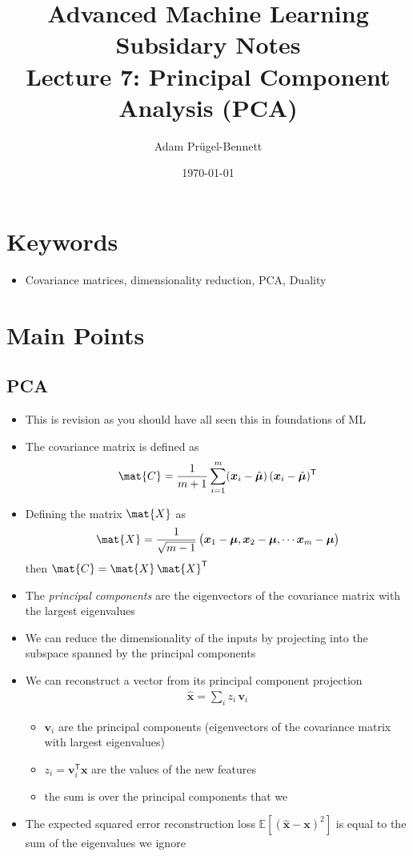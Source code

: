\documentclass[11pt]{article}
\author{Adam Prügel-Bennett}
\date{\today}
\title{Advanced Machine Learning Subsidary Notes\\\medskip
\large Lecture 7: Principal Component Analysis (PCA)}
\newcommand{\tr}{\textsf{T}}
\begin{document}
\maketitle


\section{Keywords}
\label{sec:org92ce1fa}
\begin{itemize}
\item Covariance matrices, dimensionality reduction, PCA, Duality
\end{itemize}

\section{Main Points}
\label{sec:orgbc9c8d3}

\subsection{PCA}
\label{sec:orga4fee7f}
\begin{itemize}
\item This is revision as you should have all seen this in foundations of ML
\item The covariance matrix is defined as 
$$ \mat{C}= \frac{1}{m+1} \sum_{i=1}^m
     (\bm{x}_i-\hat{\bm{\mu}})\,(\bm{x}_i-\hat{\bm{\mu}})^\tr $$
\item Defining the matrix \(\mat{X}\) as
\begin{align*}
  \mat{X} = \frac{1}{\sqrt{m-1}}\left( \strut \bm{x}_1-\bm{\mu},
  \bm{x}_2-\bm{\mu}, \cdots \bm{x}_m-\bm{\mu} \right)
\end{align*}
then \(\mat{C} = \mat{X} \, \mat{X}^\tr\)
\item The \emph{principal components} are the eigenvectors of the covariance
matrix with the largest eigenvalues
\item We can reduce the dimensionality of the inputs by projecting into
the subspace spanned by the principal components
\item We can reconstruct a vector from its principal component projection
\begin{align*}
  \hat{\bm{x}} = \sum_i z_i \, \bm{v}_i
\end{align*}
\begin{itemize}
\item \(\bm{v}_i\) are the principal components (eigenvectors of the
covariance matrix with largest eigenvalues)
\item \(z_i = \bm{v}_i^\tr \bm{x}\) are the values of the new features
\item the sum is over the principal  components that we
\end{itemize}
\item The expected squared error reconstruction loss
\(\mathbb{E}\left[(\hat{\bm{x}}-\bm{x})^2\right]\) is equal to the
sum of the eigenvalues we ignore
\end{itemize}
\end{document}
